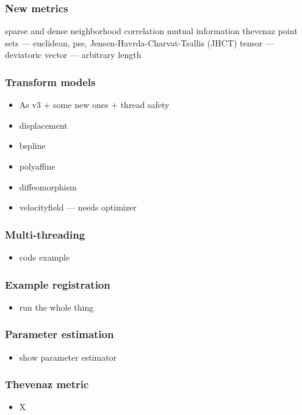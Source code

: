 \begin{frame}
\frametitle{New metrics}
\Large
\begin{itemize}
 sparse and dense neighborhood correlation
mutual information thevenaz
point sets ---  euclidean, pse, Jensen-Havrda-Charvat-Tsallis (JHCT)
tensor --- deviatoric 
vector --- arbitrary length
\end{itemize}
\end{frame}

\begin{frame}
\frametitle{Transform models}
\Large
\begin{itemize}
\item As v3 $+$ some new ones + thread safety 
\item displacement
\item bspline
\item polyaffine
\item diffeomorphism
\item velocityfield --- needs optimizer
\end{itemize}
\end{frame}

\begin{frame}
\frametitle{Multi-threading}
\Large
\begin{itemize}
\item code example
\end{itemize}
\end{frame}

\begin{frame}
\frametitle{Example registration}
\Large
\begin{itemize}
\item run the whole thing
\end{itemize}
\end{frame}

\begin{frame}
\frametitle{Parameter estimation }
\Large
\begin{itemize}
\item show parameter estimator 
\end{itemize}
\end{frame}

\begin{frame}
\frametitle{Thevenaz metric}
\Large
\begin{itemize}
\item X
\end{itemize}
\end{frame}

